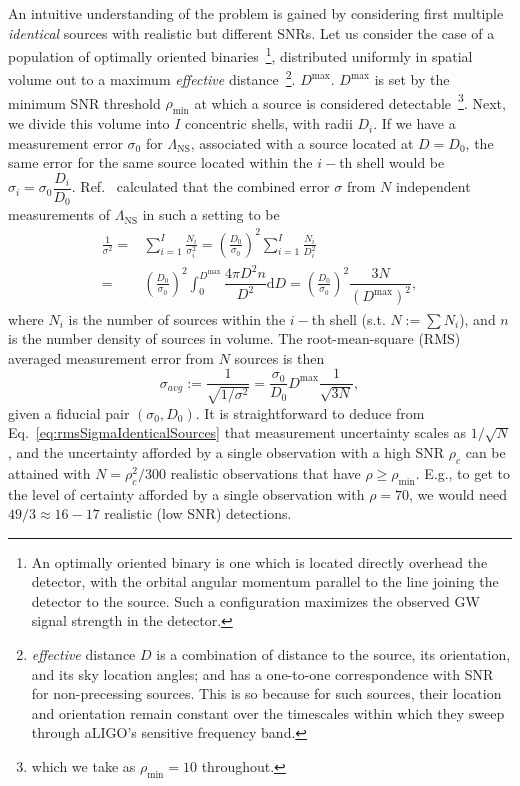 \documentclass[aps,prd,amsmath,floats,floatfix, twocolumn,
superscriptaddress,nofootinbib,showpacs]{revtex4-1}
\newcommand{\D}{\mathrm{d}}
\newcommand{\lambdans}{\Lambda_\mathrm{NS}}
\begin{document}
% 
An intuitive understanding of the problem is gained by considering first
multiple {\it identical} sources with realistic but different SNRs. Let us consider the case
of a population of optimally oriented binaries~\footnote{An optimally oriented
binary is one which is located directly overhead the detector, with the 
orbital angular momentum parallel to the line joining the detector to the
source. Such a configuration maximizes the observed GW signal strength in 
the detector.}, distributed uniformly in spatial volume out
to a maximum {\it effective} distance~\footnote{{\it effective} distance $D$ 
is a combination of distance to the source, its orientation, and its sky
location angles; and has a one-to-one correspondence with SNR for non-precessing
sources. This is so because for such sources, their location and orientation
remain constant over the timescales within which they sweep through
aLIGO's sensitive frequency band.}.
$D^\mathrm{max}$. $D^\mathrm{max}$ is set by the minimum SNR 
threshold $\rho_\mathrm{min}$ at which a source is considered
detectable~\footnote{which
we take as $\rho_\mathrm{min}=10$ throughout.}. Next, we divide this volume into $I$
concentric shells, with radii $D_i$. If we have a measurement error
$\sigma_0$ for $\lambdans$, associated with a source located at $D=D_0$,
the same error for the same source located within the $i-$th shell would
be $\sigma_i=\sigma_0 \dfrac{D_i}{D_0}$. Ref.~\cite{Markakis:2010mp}
calculated that the combined error $\sigma$ from $N$ independent
measurements of $\lambdans$ in such a setting to be
% 
\begin{align}\label{eq:1oversigma}
\frac{1}{\sigma^2} =& \sum_{i=1}^I \frac{N_i}{\sigma_i^2} = \left(\frac{D_0}{\sigma_0}\right)^2 \sum_{i=1}^I\frac{N_i}{D_i^2}\\ \nonumber =& \left(\frac{D_0}{\sigma_0}\right)^2 \int_0^{D^\mathrm{max}} \dfrac{4\pi D^2 n}{D^2}\D D = \left(\frac{D_0}{\sigma_0}\right)^2 \dfrac{3N}{(D^\mathrm{max})^2},
\end{align}
% 
where $N_i$ is the number of sources within the $i-$th shell (s.t.
$N:=\sum N_i$), and $n$ is the number density of sources in volume.
% 
The root-mean-square (RMS) averaged measurement error from $N$ sources is 
then~\cite{Markakis:2010mp}
\begin{equation}\label{eq:rmsSigmaIdenticalSources}
 \sigma_{avg} := \frac{1}{\sqrt{1/\sigma^{2}}} = \frac{\sigma_0}{D_0} D^\mathrm{max} \frac{1}{\sqrt{3 N}},
\end{equation}
given a fiducial pair $(\sigma_0, D_0)$. It is straightforward to deduce from
Eq.~\ref{eq:rmsSigmaIdenticalSources} that measurement uncertainty scales as 
$1/\sqrt{N}$, and the uncertainty afforded by a single observation with a high
SNR $\rho_c$ can be attained with $N = \rho_c^2/300$ realistic observations
that have $\rho\geq\rho_\mathrm{min}$. E.g., to get to the
level of certainty afforded by a single observation with $\rho=70$, we would
need $49/3\approx 16-17$ realistic (low SNR) detections.
\end{document}
